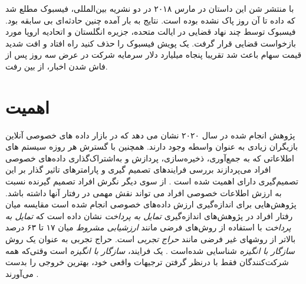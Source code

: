  با منتشر شن این داستان در مارس ۲۰۱۸ در دو نشریه بین‌المللی، فیسبوک
 مطلع شد که داده تا آن روز پاک نشده بوده است. نتایج به بار آمده
 چنین حادثه‌ای بی سابقه بود. فیسبوک توسط چند نهاد قضایی در ایالت متحده، 
 جزیره انگلستان و اتحادیه اروپا مورد بازخواست قضایی قرار گرفت. یک پویش
 فیسبوک را حذف کنید راه افتاد و افت شدید قیمت سهام باعث شد تقریبا پنجاه میلیارد دلار
 سرمایه شرکت در عرض سه روز پس از فاش شدن اخبار، از بین رفت.




\section{اهمیت}
پژوهش انجام شده در سال ۲۰۲۰ نشان می دهد که در بازار داده های خصوصی آنلاین بازیگران زیادی به عنوان واسطه وجود دارند.
\!\cite{agogoInvisibleMarketOnline2021}
همچنین با گسترش هر روزه سیستم های اطلاعاتی که به
جمع‌آوری، ذخیره‌سازی، پردازش و به‌اشتراک‌گذاری داده‌های
خصوصی افراد می‌پردازند بررسی فرایندهای
تصمیم گیری و پارامتر‌های تاثیر گذار
بر این تصمیم‌گیری دارای اهمیت شده است
\!.
\!\cite{spiekermannValuesEthicsInformation2022}
از سوی دیگر نگرش افراد تصمیم گیرنده نسبت به ارزش اطلاعات خصوصی افراد می تواند نقش مهمی در رفتار آنها داشته باشد.
پژوهش‌هایی برای اندازه‌گیری ارزش داده‌های خصوصی انجام شده است
\!\cite{  fastValuePersonalData2021a,wesselsSellNotSell2019,tangHowChineseWeb2021}
\ifWillingnessToPay
  مقایسه میان رفتار افراد در پژوهش‌های اندازه‌گیری
  \textit{تمایل به پرداخت}
  نشان داده است که
  \textit{تمایل به پرداخت }
  با استفاده از روش‌های فرضی مانند
  \textit{ارزشيابی مشروط}
  میان ۱۷ تا ۶۳ درصد بالاتر
  از روشهای غیر فرضی مانند
  \textit{حراج تجربی}
  است.
  حراج تجربی به عنوان یک روش
  \textit{سازگار با انگیزه}
  شناسایی شده‌است
  \!\citep{martinez-carrascoComparingHypotheticalNonhypothetical2015}
  .
  یک فرایند،
  \textit{سازگار با انگیزه}
  است وقتی‌که همه شرکت‌کنندگان فقط  با درنظر گرفتن ترجیهات واقعی خود، بهترین خروجی را بدست می‌آورند
  \!\citep{nisanAlgorithmicGameTheory2007}
  \!.

